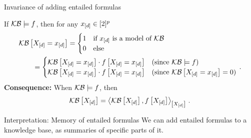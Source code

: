 \documentclass{beamer}
\begin{document}
    \begin{frame}{Invariance of adding entailed formulas}


        If $\mathcal{KB}\models f$, then for any $x_{[d]}\in[2]^p$
        \begin{align*}
            &\mathcal{KB}\left[X_{[d]}=x_{[d]}\right]
            = \begin{cases}
                  1 & \text{if $x_{[d]}$ is a model of $\mathcal{KB}$} \\
                  0 & \text{else}
            \end{cases} \\
            &\quad\quad = \begin{cases}
                              \mathcal{KB}\left[X_{[d]}=x_{[d]}\right] \cdot f\left[X_{[d]}=x_{[d]}\right] &
                              \text{(since $\mathcal{KB}\models f$)} \\
                              \mathcal{KB}\left[X_{[d]}=x_{[d]}\right] \cdot f\left[X_{[d]}=x_{[d]}\right] &
                              \text{(since $\mathcal{KB}\left[X_{[d]}=x_{[d]}\right]=0$)}
            \end{cases} \, .
        \end{align*}
            {\bf Consequence:} When $\mathcal{KB}\models f$, then
        \begin{align*}
            \mathcal{KB}\left[X_{[d]}\right]
            = \left\langle \mathcal{KB}\left[X_{[d]}\right],f\left[X_{[d]}\right]\right\rangle_{\left[ X_{[d]} \right]} \, .
        \end{align*}

        \begin{block}{Interpretation: Memory of entailed formulas}
            We can add entailed formulas to a knowledge base, as summaries of specific parts of it.
        \end{block}

    \end{frame}
\end{document}
